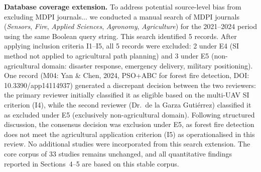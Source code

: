 \documentclass[review,3p,times]{elsarticle}
\begin{document}
\textbf{Database coverage extension.} To address potential source-level bias from excluding MDPI journals... we conducted a manual search of MDPI journals (\textit{Sensors}, \textit{Fire}, \textit{Applied Sciences}, \textit{Agronomy}, \textit{Agriculture}) for the 2021--2024 period using the same Boolean query string. This search identified 5 records. After applying inclusion criteria I1--I5, all 5 records were excluded: 2 under E4 (SI method not applied to agricultural path planning) and 3 under E5 (non-agricultural domain: disaster response, emergency delivery, military positioning). One record (M04: Yan \& Chen, 2024, PSO+ABC for forest fire detection, DOI: 10.3390/app14114937) generated a discrepant decision between the two reviewers: the primary reviewer initially classified it as eligible based on the multi-UAV SI criterion (I4), while the second reviewer (Dr.\ de la Garza Gutiérrez) classified it as excluded under E5 (exclusively non-agricultural domain). Following structured discussion, the consensus decision was exclusion under E5, as forest fire detection does not meet the agricultural application criterion (I5) as operationalised in this review. No additional studies were incorporated from this search extension. The core corpus of 33 studies remains unchanged, and all quantitative findings reported in Sections~4--5 are based on this stable corpus.
\end{document}
